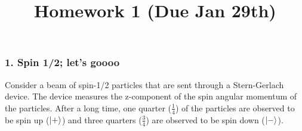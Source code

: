 \documentclass[
]{article}
\title{Homework 1 (Due Jan 29th)}
\author{}
\date{}
\begin{document}
\maketitle

\hypertarget{spin-12-lets-goooo}{%
\subsubsection{1. Spin 1/2; let's goooo}\label{spin-12-lets-goooo}}

Consider a beam of spin-1/2 particles that are sent through a
Stern-Gerlach device. The device measures the z-component of the spin
angular momentum of the particles. After a long time, one quarter
(\(\frac{1}{4}\)) of the particles are observed to be spin up
(\(\ket{+}\)) and three quarters (\(\frac{3}{4}\)) are observed to be
spin down (\(\ket{-}\)).
\end{document}
